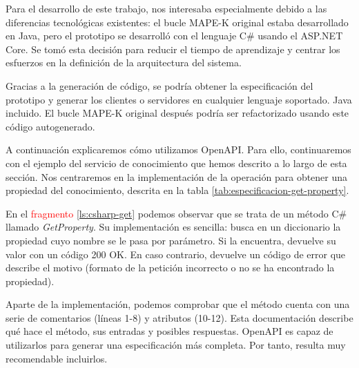 Para el desarrollo de este trabajo, nos interesaba especialmente debido a las diferencias tecnológicas existentes: el bucle MAPE-K original estaba desarrollado en Java, pero el prototipo se desarrolló con el lenguaje C\# usando el  ASP.NET Core. Se tomó esta decisión para reducir el tiempo de aprendizaje y centrar los esfuerzos en la definición de la arquitectura del sistema.

Gracias a la generación de código, se podría obtener la especificación del prototipo y generar los clientes o servidores en cualquier lenguaje soportado. Java incluido. El bucle MAPE-K original después podría ser refactorizado usando este código autogenerado.

A continuación explicaremos cómo utilizamos OpenAPI. Para ello, continuaremos con el ejemplo del servicio de conocimiento que hemos descrito a lo largo de esta sección. Nos centraremos en la implementación de la operación para obtener una propiedad del conocimiento, descrita en la tabla \ref{tab:especificacion-get-property}.

En el \textcolor{red}{fragmento} \ref{ls:csharp-get} podemos observar que se trata de un método C\# llamado \emph{GetProperty}. Su implementación es sencilla: busca en un diccionario la propiedad cuyo nombre se le pasa por parámetro. Si la encuentra, devuelve su valor con un código 200 OK. En caso contrario, devuelve un código de error que describe el motivo (formato de la petición incorrecto o no se ha encontrado la propiedad).

Aparte de la implementación, podemos comprobar que el método cuenta con una serie de comentarios (líneas 1-8) y atributos (10-12). Esta documentación describe qué hace el método, sus entradas y posibles respuestas. OpenAPI es capaz de utilizarlos para generar una especificación más completa. Por tanto, resulta muy recomendable incluirlos.

